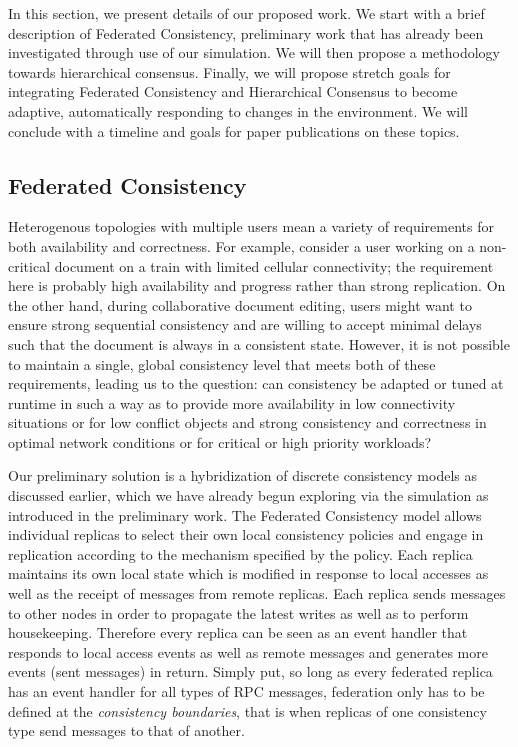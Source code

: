 \documentclass{article}
\begin{document}
In this section, we present details of our proposed work. We start with a brief description of Federated Consistency, preliminary work that has already been investigated through use of our simulation. We will then propose a methodology towards hierarchical consensus. Finally, we will propose stretch goals for integrating Federated Consistency and Hierarchical Consensus to become adaptive, automatically responding to changes in the environment. We will conclude with a timeline and goals for paper publications on these topics.

\subsection{Federated Consistency}
\label{sec:federated}

Heterogenous topologies with multiple users mean a variety of requirements for both availability and correctness. For example, consider a user working on a non-critical document on a train with limited cellular connectivity; the requirement here is probably high availability and progress rather than strong replication. On the other hand, during collaborative document editing, users might want to ensure strong sequential consistency and are willing to accept minimal delays such that the document is always in a consistent state. However, it is not possible to maintain a single, global consistency level that meets both of these requirements, leading us to the question: can consistency be adapted or tuned at runtime in such a way as to provide more availability in low connectivity situations or for low conflict objects and strong consistency and correctness in optimal network conditions or for critical or high priority workloads?

Our preliminary solution is a hybridization of discrete consistency models as discussed earlier, which we have already begun exploring via the simulation as introduced in the preliminary work. The Federated Consistency model allows individual replicas to select their own local consistency policies and engage in replication according to the mechanism specified by the policy. Each replica maintains its own local state which is modified in response to local accesses as well as the receipt of messages from remote replicas. Each replica sends messages to other nodes in order to propagate the latest writes as well as to perform housekeeping. Therefore every replica can be seen as an event handler that responds to local access events as well as remote messages and generates more events (sent messages) in return. Simply put, so long as every federated replica has an event handler for all types of RPC messages, federation only has to be defined at the \textit{consistency boundaries}, that is when replicas of one consistency type send messages to that of another.
\end{document}
